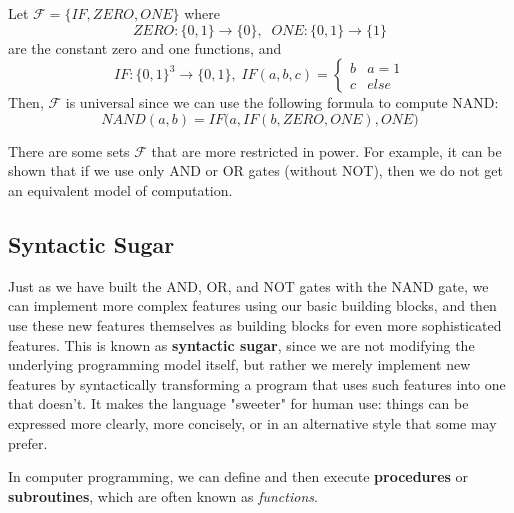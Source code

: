   \begin{definition}[Multiplexor]
    
  \end{definition}

  \begin{example}
    Let $\mathcal{F} = \{IF, ZERO, ONE\}$ where 
    \begin{equation}
      ZERO: \{0,1\} \longrightarrow \{0\}, \;\; ONE: \{0,1\} \longrightarrow \{1\}
    \end{equation}
    are the constant zero and one functions, and 
    \begin{equation}
      IF: \{0,1\}^3 \longrightarrow \{0,1\}, \; IF (a, b, c) = \begin{cases}
        b & a = 1 \\
        c & else 
      \end{cases}
    \end{equation}
    Then, $\mathcal{F}$ is universal since we can use the following formula to compute NAND: 
    \begin{equation}
      NAND(a, b) = IF\big( a, IF(b, ZERO, ONE), ONE\big)
    \end{equation}
  \end{example}

  There are some sets $\mathcal{F}$ that are more restricted in power. For example, it can be shown that if we use only AND or OR gates (without NOT), then we do not get an equivalent model of computation. 

\subsection{Syntactic Sugar}

  Just as we have built the AND, OR, and NOT gates with the NAND gate, we can implement more complex features using our basic building blocks, and then use these new features themselves as building blocks for even more sophisticated features. This is known as \textbf{syntactic sugar}, since we are not modifying the underlying programming model itself, but rather we merely implement new features by syntactically transforming a program that uses such features into one that doesn’t. It makes the language "sweeter" for human use: things can be expressed more clearly, more concisely, or in an alternative style that some may prefer.

  In computer programming, we can define and then execute \textbf{procedures} or \textbf{subroutines}, which are often known as \textit{functions}. 

